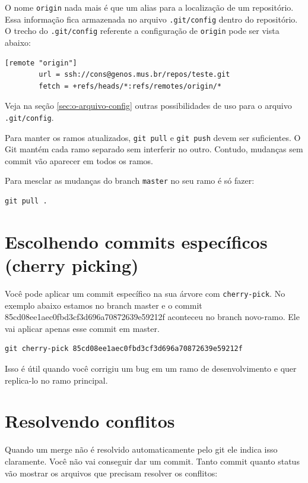 \documentclass[12pt,brazil]{book}
\begin{document}
O nome \texttt{origin} nada mais é que um alias para a localização de
um repositório. Essa informação fica armazenada no arquivo
\texttt{.git/config} dentro do repositório. O trecho do
\texttt{.git/config} referente a configuração de \texttt{origin} pode
ser vista abaixo:

\begin{verbatim}
[remote "origin"]
        url = ssh://cons@genos.mus.br/repos/teste.git
        fetch = +refs/heads/*:refs/remotes/origin/*
\end{verbatim}

Veja na seção \ref{sec:o-arquivo-config} outras possibilidades de uso
para o arquivo \texttt{.git/config}.

Para manter os ramos atualizados, \texttt{git pull} e \texttt{git
  push} devem ser suficientes. O Git mantém cada ramo separado sem
interferir no outro. Contudo, mudanças sem commit vão aparecer em
todos os ramos.

Para mesclar as mudanças do branch \texttt{master} no seu ramo é só
fazer:

\begin{verbatim}
git pull .
\end{verbatim}

\section{Escolhendo commits específicos (cherry picking)}
\label{sec:escolh-comm-espec}

Você pode aplicar um commit específico na sua árvore com
\texttt{cherry-pick}. No exemplo abaixo estamos no branch master e o
commit 85cd08ee1aec0fbd3cf3d696a70872639e59212f aconteceu no branch
novo-ramo. Ele vai aplicar apenas esse commit em master.

\begin{verbatim}
git cherry-pick 85cd08ee1aec0fbd3cf3d696a70872639e59212f
\end{verbatim}

Isso é útil quando você corrigiu um bug em um ramo de desenvolvimento
e quer replica-lo no ramo principal.

\section{Resolvendo conflitos}
\label{sec:resolvendo-conflitos}

Quando um merge não é resolvido automaticamente pelo git ele indica
isso claramente. Você não vai conseguir dar um commit. Tanto commit
quanto status vão mostrar os arquivos que precisam resolver os
conflitos:
\end{document}
